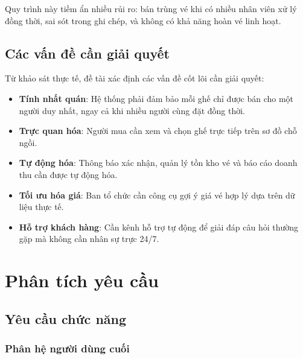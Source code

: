 \documentclass[../main.tex]{subfiles}
\begin{document}
Quy trình này tiềm ẩn nhiều rủi ro: bán trùng vé khi có nhiều nhân viên xử lý đồng thời, sai sót trong ghi chép, và không có khả năng hoàn vé linh hoạt.

\subsection{Các vấn đề cần giải quyết}

Từ khảo sát thực tế, đề tài xác định các vấn đề cốt lõi cần giải quyết:

\begin{itemize}
    \item \textbf{Tính nhất quán}: Hệ thống phải đảm bảo mỗi ghế chỉ được bán cho một người duy nhất, ngay cả khi nhiều người cùng đặt đồng thời.
    \item \textbf{Trực quan hóa}: Người mua cần xem và chọn ghế trực tiếp trên sơ đồ chỗ ngồi.
    \item \textbf{Tự động hóa}: Thông báo xác nhận, quản lý tồn kho vé và báo cáo doanh thu cần được tự động hóa.
    \item \textbf{Tối ưu hóa giá}: Ban tổ chức cần công cụ gợi ý giá vé hợp lý dựa trên dữ liệu thực tế.
    \item \textbf{Hỗ trợ khách hàng}: Cần kênh hỗ trợ tự động để giải đáp câu hỏi thường gặp mà không cần nhân sự trực 24/7.
\end{itemize}

\section{Phân tích yêu cầu}

\subsection{Yêu cầu chức năng}

\subsubsection{Phân hệ người dùng cuối}
\end{document}
